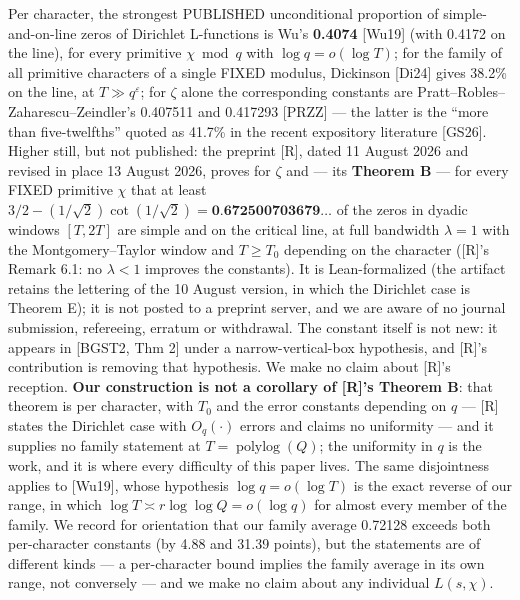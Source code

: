 \documentclass[11pt]{amsart}
\theoremstyle{plain}
\theoremstyle{remark}
\begin{document}
Per character, the strongest PUBLISHED unconditional proportion of simple-and-on-line
zeros of Dirichlet L-functions is Wu's \textbf{0.4074} [Wu19] (with 0.4172 on the
line), for every primitive $\chi \bmod q$ with $\log q = o(\log T)$; for the family of
all primitive characters of a single FIXED modulus, Dickinson [Di24] gives 38.2\% on
the line, at $T \gg q^\varepsilon$; for $\zeta$ alone the corresponding constants are
Pratt--Robles--Zaharescu--Zeindler's 0.407511 and 0.417293 [PRZZ] --- the latter is the
``more than five-twelfths'' quoted as 41.7\% in the recent expository literature
[GS26]. Higher still, but not published: the preprint [R], dated 11 August 2026 and
revised in place 13 August 2026, proves for $\zeta$ and --- its \textbf{Theorem B} ---
for every FIXED primitive $\chi$ that at least
$3/2 - (1/\sqrt{2})\cot(1/\sqrt{2}) = \textbf{0.672500703679}\dots$ of the zeros in
dyadic windows $[T, 2T]$ are simple and on the critical line, at full bandwidth
$\lambda = 1$ with the Montgomery--Taylor window and $T \ge T_0$ depending on the
character ([R]'s Remark 6.1: no $\lambda < 1$ improves the constants). It is
Lean-formalized (the artifact retains the lettering of the 10 August version, in which
the Dirichlet case is Theorem E); it is not posted to a preprint server, and we are
aware of no journal submission, refereeing, erratum or withdrawal. The constant itself
is not new: it appears in [BGST2, Thm 2] under a narrow-vertical-box hypothesis, and
[R]'s contribution is removing that hypothesis. We make no claim about [R]'s reception.
\textbf{Our construction is not a corollary of [R]'s Theorem B}: that theorem is per
character, with $T_0$ and the error constants depending on $q$ --- [R] states the
Dirichlet case with $O_q(\cdot)$ errors and claims no uniformity --- and it supplies no
family statement at $T = \operatorname{polylog}(Q)$; the uniformity in $q$ is the work,
and it is where every difficulty of this paper lives. The same disjointness applies to
[Wu19], whose hypothesis $\log q = o(\log T)$ is the exact reverse of our range, in
which $\log T \asymp r \log \log Q = o(\log q)$ for almost every member of the family.
We record for orientation that our family average 0.72128 exceeds both per-character
constants (by 4.88 and 31.39 points), but the statements are of different kinds --- a
per-character bound implies the family average in its own range, not conversely --- and
we make no claim about any individual $L(s, \chi)$.
\end{document}
